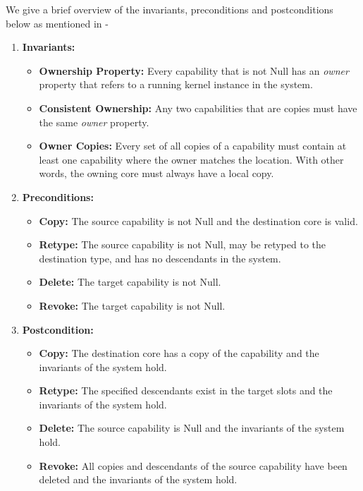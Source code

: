 We give a brief overview of the invariants, preconditions and postconditions below as mentioned in \cite{nevillmasters}-

\begin{enumerate}
\item \textbf{Invariants:}
	\begin{itemize}
	\item \textbf{Ownership Property:} Every capability that is not Null has an \textit{owner} property that refers to a running kernel instance in the system.
	\item \textbf{Consistent Ownership:} Any two capabilities that are copies must have the same \textit{owner} property.
	\item \textbf{Owner Copies:} Every set of all copies of a capability must contain at least one capability where the owner matches the location. With other words, the owning core must always have a local copy.
	\end{itemize}
	
\item \textbf{Preconditions:}
\begin{itemize}
\item \textbf{Copy:} The source capability is not Null and the destination core is valid.
\item \textbf{Retype:} The source capability is not Null, may be retyped to the destination type, and has no descendants in the system.
\item \textbf{Delete:} The target capability is not Null.
\item \textbf{Revoke:} The target capability is not Null.
\end{itemize}

\item \textbf{Postcondition:}
\begin{itemize}
\item \textbf{Copy:} The destination core has a copy of the capability and the invariants of the system hold.
\item \textbf{Retype:} The specified descendants exist in the target slots and the invariants of the system hold.
\item \textbf{Delete:} The source capability is Null and the invariants of the system hold.
\item \textbf{Revoke:} All copies and descendants of the source capability have been deleted and the invariants of the system hold.
\end{itemize}
\end{enumerate}

